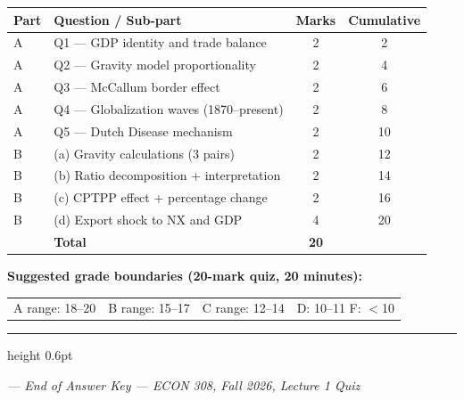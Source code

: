 \documentclass[11pt]{article}
\begin{document}
\begin{center}
\begin{tabular}{llcc}
\toprule
\textbf{Part} & \textbf{Question / Sub-part} & \textbf{Marks} & \textbf{Cumulative}\\
\midrule
A & Q1 — GDP identity and trade balance & 2 & 2\\
A & Q2 — Gravity model proportionality & 2 & 4\\
A & Q3 — McCallum border effect & 2 & 6\\
A & Q4 — Globalization waves (1870--present) & 2 & 8\\
A & Q5 — Dutch Disease mechanism & 2 & 10\\
\midrule
B & (a) Gravity calculations (3 pairs) & 2 & 12\\
B & (b) Ratio decomposition + interpretation & 2 & 14\\
B & (c) CPTPP effect + percentage change & 2 & 16\\
B & (d) Export shock to NX and GDP & 4 & 20\\
\midrule
  & \textbf{Total} & \textbf{20} & \\
\bottomrule
\end{tabular}
\end{center}

\vspace{0.8em}

\begin{databox}
\small\textbf{Suggested grade boundaries (20-mark quiz, 20 minutes):}\\[0.3em]
\begin{tabular}{@{}llll@{}}
A range: 18--20 & B range: 15--17 & C range: 12--14 & D: 10--11 \quad F: $<$10
\end{tabular}
\end{databox}

\vspace{1em}
{\color{UNBCGold}\hrule height 0.6pt}
\begin{center}
\small\itshape
--- End of Answer Key --- \quad ECON 308, Fall 2026, Lecture 1 Quiz
\end{center}
\end{document}
